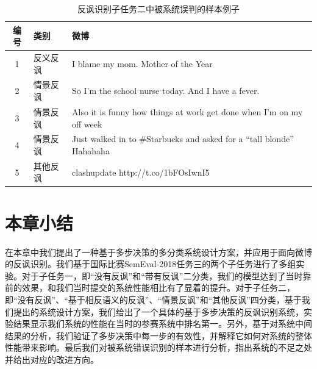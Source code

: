\begin{table}[htb]
  \centering
  \begin{minipage}[t]{\linewidth} %
  \caption{反讽识别子任务二中被系统误判的样本例子}
  \label{tab:semeval_2018_task3_error}
  \begin{tabularx}{\linewidth}{c|l|X}
    \toprule[1.5pt]
    编号 & 类别 & 微博 \\
    \hline
    1 & 反义反讽 & I blame my mom. Mother of the Year \\
    2 & 情景反讽 & So I'm the school nurse today. And I have a fever. \\
    3 & 情景反讽 & Also it is funny how things at work get done when I'm on my off week \\
    4 & 情景反讽 & Just walked in to \#Starbucks and asked for a “tall blonde” Hahahaha \\
    5 & 其他反讽 & clashupdate http://t.co/1bFOsIwnI5 \\
    \bottomrule[1.5pt]
  \end{tabularx}
  \end{minipage}
\end{table}

\section{本章小结}

在本章中我们提出了一种基于多步决策的多分类系统设计方案，并应用于面向微博的反讽识别。我们基于国际比赛SemEval-2018任务三的两个子任务进行了多组实验。对于子任务一，即“没有反讽”和“带有反讽”二分类，我们的模型达到了当时靠前的效果，和我们当时提交的系统性能相比有了显着的提升。对于子任务二，即“没有反讽”、“基于相反语义的反讽”、“情景反讽”和“其他反讽”四分类，基于我们提出的系统设计方案，我们给出了一个具体的基于多步决策的反讽识别系统，实验结果显示我们系统的性能在当时的参赛系统中排名第一。另外，基于对系统中间结果的分析，我们验证了多步决策中每一步的有效性，并解释它如何对系统的整体性能带来影响。最后我们对被系统错误识别的样本进行分析，指出系统的不足之处并给出对应的改进方向。
